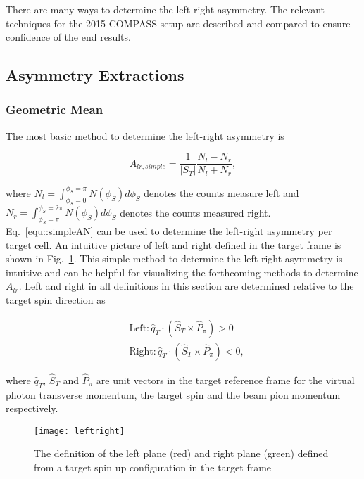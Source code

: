 There are many ways to determine the left-right asymmetry.  The relevant
techniques for the 2015 COMPASS setup are described and compared to ensure
confidence of the end results.  

\subsection{Asymmetry Extractions}
\subsubsection{Geometric Mean} \label{sec::GeoMean}
The most basic method to determine the left-right asymmetry is

\begin{equation}
  \label{equ::simpleAN}
  A_{lr,simple} = \frac{1}{|S_T|}
    \frac{N_l - N_r}{N_l + N_r},
\end{equation}

\noindent
where $N_l = \int_{\phi_S=0}^{\phi_S=\pi}N(\phi_S)d\phi_S$ denotes the counts
measure left and $N_r = \int_{\phi_S=\pi}^{\phi_S=2\pi}N(\phi_S)d\phi_S$ denotes
the counts measured right.  Eq.~\ref{equ::simpleAN} can be used to determine the
left-right asymmetry per target cell.  An intuitive picture of left and right
defined in the target frame is shown in Fig.~\ref{fig::leftright}.  This simple
method to determine the left-right asymmetry is intuitive and can be helpful for
visualizing the forthcoming methods to determine $A_{lr}$.  Left and right in
all definitions in this section are determined relative to the target spin
direction as

\begin{equation}
  \label{equ::Defleftright}
  \begin{aligned}
    &\text{Left}: \hat{q}_T \cdot (\hat{S}_T \times \hat{P}_{\pi}) > 0 \\
    &\text{Right}: \hat{q}_T \cdot (\hat{S}_T \times \hat{P}_{\pi}) < 0, 
  \end{aligned}
\end{equation}

\noindent
where $\hat{q}_T$, $\hat{S}_T$ and $\hat{P}_{\pi}$ are unit vectors in the
target reference frame for the virtual photon transverse momentum, the target
spin and the beam pion momentum respectively.

\begin{figure}[h!t]
  \centering
  \texttt{[image: leftright]}
  \caption{The definition of the left plane (red) and right plane (green)
    defined from a target spin up configuration in the target frame}
  \label{fig::leftright}
\end{figure}

